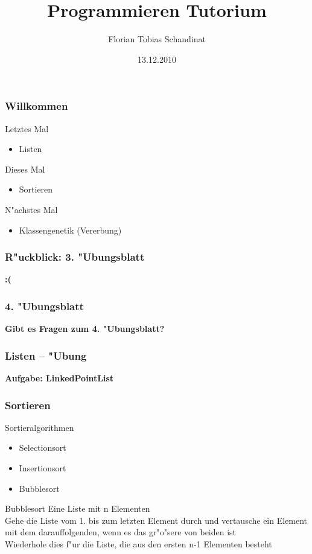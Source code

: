 \documentclass{beamer}
\title{Programmieren Tutorium}
\author{Florian Tobias Schandinat}
\date{13.12.2010}
\institute{FTS}
\begin{document}
\begin{frame}
\frametitle{Willkommen}
\pause
\begin{alertblock}{Letztes Mal}
\begin{itemize}
\item Listen
\end{itemize}
\end{alertblock}

\begin{block}{Dieses Mal}
\begin{itemize}
\item Sortieren
\end{itemize}
\end{block}

\begin{exampleblock}{N"achstes Mal}
\begin{itemize}
\item Klassengenetik (Vererbung)
\end{itemize}
\end{exampleblock}
\end{frame}


\begin{frame}
\frametitle{R"uckblick: 3. "Ubungsblatt}
\begin{center}
\textbf{\Huge :(}
\end{center}
\end{frame}


\begin{frame}
\frametitle{4. "Ubungsblatt}
\begin{center}
\textbf{\Huge Gibt es Fragen zum 4. "Ubungsblatt?}
\end{center}
\end{frame}


\begin{frame}
\frametitle{Listen -- "Ubung}
\begin{center}
\textbf{\Huge Aufgabe: LinkedPointList}
\end{center}
\end{frame}

\begin{frame}
\frametitle{Sortieren}
\begin{block}{Sortieralgorithmen}
\pause
\begin{itemize}
\item Selectionsort
\item Insertionsort
\item Bubblesort
\end{itemize}
\end{block}

\begin{block}{Bubblesort}
\pause
Eine Liste mit n Elementen\\
Gehe die Liste vom 1. bis zum letzten Element durch und vertausche ein Element mit dem darauffolgenden, wenn es das gr"o"sere von beiden ist\\
Wiederhole dies f"ur die Liste, die aus den ersten n-1 Elementen besteht
\end{block}
\end{frame}
\end{document}
